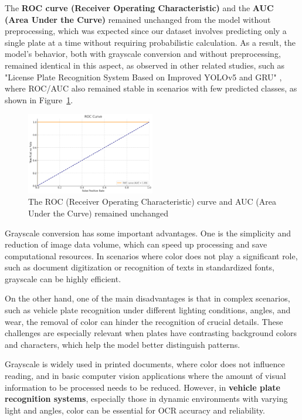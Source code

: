 \documentclass[conference]{IEEEtran}
\begin{document}
    The \textbf{ROC curve (Receiver Operating Characteristic)} and the \textbf{AUC (Area Under the Curve)} remained unchanged from the model without preprocessing, which was expected since our dataset involves predicting only a single plate at a time without requiring probabilistic calculation. As a result, the model's behavior, both with grayscale conversion and without preprocessing, remained identical in this aspect, as observed in other related studies, such as "License Plate Recognition System Based on Improved YOLOv5 and GRU" \cite{b8}, where ROC/AUC also remained stable in scenarios with few predicted classes, as shown in Figure~\ref{img7}.
    
    \begin{figure}[htbp]
        \centerline{\includegraphics[width=0.5\textwidth]{img7.png}}
        \caption{The ROC (Receiver Operating Characteristic) curve and AUC (Area Under the Curve) remained unchanged}
        \label{img7}
    \end{figure}
    
    Grayscale conversion has some important advantages. One is the simplicity and reduction of image data volume, which can speed up processing and save computational resources. In scenarios where color does not play a significant role, such as document digitization or recognition of texts in standardized fonts, grayscale can be highly efficient.
    
    On the other hand, one of the main disadvantages is that in complex scenarios, such as vehicle plate recognition under different lighting conditions, angles, and wear, the removal of color can hinder the recognition of crucial details. These challenges are especially relevant when plates have contrasting background colors and characters, which help the model better distinguish patterns.
    
    Grayscale is widely used in printed documents, where color does not influence reading, and in basic computer vision applications where the amount of visual information to be processed needs to be reduced. However, in \textbf{vehicle plate recognition systems}, especially those in dynamic environments with varying light and angles, color can be essential for OCR accuracy and reliability.
    
\end{document}
